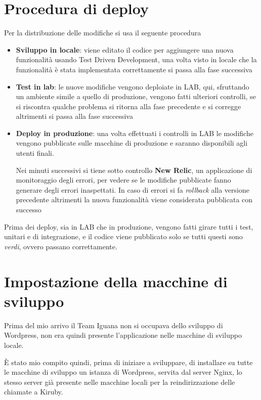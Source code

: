 \section{Procedura di deploy}
Per la distribuzione delle modifiche si usa il seguente procedura
\begin{itemize}
\item {\bf Sviluppo in locale}: viene editato il codice per aggiungere una nuova funzionalità usando
Test Driven Development, una volta visto in locale che la funzionalità è stata implementata correttamente si passa alla fase successiva
\item {\bf Test in lab}: le nuove modifiche vengono deploiate in LAB, qui, sfruttando un ambiente simile a quello di 
produzione, vengono fatti ulteriori controlli, se si riscontra qualche problema si ritorna alla fase precedente e si corregge
altrimenti si passa alla fase successiva 
\item {\bf Deploy in produzione}: una volta effettuati i controlli in LAB le modifiche vengono pubblicate sulle macchine
di produzione e saranno disponibili agli utenti finali. 

Nei minuti successivi si tiene sotto controllo {\bf New Relic}, un
applicazione di monitoraggio degli errori, per vedere se le modifiche pubblicate fanno generare degli errori inaspettati.
In caso di errori si fa \emph{rollback} alla versione precedente altrimenti la nuova funzionalità viene considerata pubblicata con successo
\end{itemize}

Prima dei deploy, sia in LAB che in produzione, vengono fatti girare tutti i test, unitari e di integrazione, e il codice viene pubblicato solo se tutti questi sono \emph{verdi}, ovvero passano correttamente.

\section{Impostazione della macchine di sviluppo}

Prima del mio arrivo il Team Iguana non si occupava dello sviluppo di Wordpress, non era quindi presente
l'applicazione nelle macchine di sviluppo locale.

È stato mio compito quindi, prima di iniziare a sviluppare, di installare su tutte le macchine di sviluppo
un istanza di Wordpress, servita dal server Nginx\cite{NGINX}, lo stesso server già presente nelle macchine locali per
la reindirizzazione delle chiamate a Kiruby.

